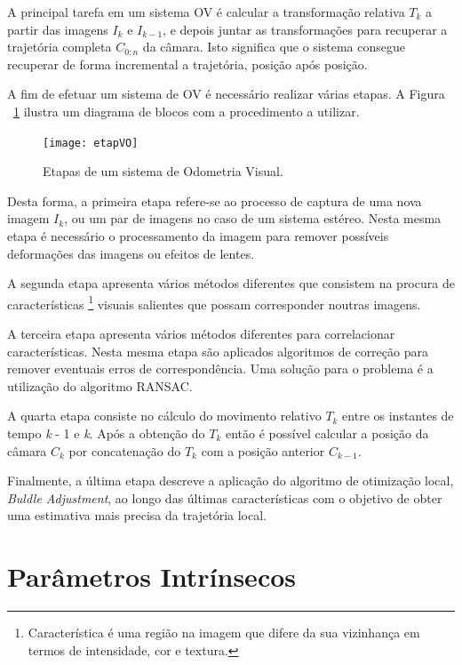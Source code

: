 A principal tarefa em um sistema OV é calcular a transformação relativa $T_k$ a partir das imagens $I_k$ e $I_{k-1}$, e depois juntar as transformações para recuperar a trajetória completa $C_{0:n}$ da câmara. Isto significa que o sistema consegue recuperar de forma incremental a trajetória, posição após posição.

A fim de efetuar um sistema de OV é necessário realizar várias etapas. A Figura ~\ref{fig:etapVO} ilustra um diagrama de blocos com a procedimento a utilizar.

\begin{figure}[h!] %
	\begin{center}
		\leavevmode		
		\texttt{[image: etapVO]}
		\caption{Etapas de um sistema de Odometria Visual.}
		\label{fig:etapVO}
	\end{center}
\end{figure}

Desta forma, a primeira etapa refere-se  ao processo de captura de uma nova imagem \textit{$I_k$}, ou um par de imagens no caso de um sistema estéreo. Nesta mesma etapa é necessário o processamento da imagem para remover possíveis deformações das imagens ou efeitos de lentes.

A segunda etapa apresenta vários métodos diferentes que consistem na procura de características  \footnote{Característica é uma região na imagem que difere da sua vizinhança em termos de intensidade, cor e textura.} visuais salientes que possam corresponder noutras imagens.

A terceira etapa apresenta vários métodos diferentes para correlacionar características. Nesta mesma etapa são aplicados algoritmos de correção  para remover eventuais erros de correspondência. Uma solução para o problema é a utilização do algoritmo RANSAC.

A quarta etapa consiste no cálculo do movimento relativo $T_k$ entre os instantes de tempo \textit{k} - 1 e \textit{k}. Após a obtenção do $T_k$ então é possível calcular a posição da câmara $C_k$ por concatenação do $T_k$ com a posição anterior $C_{k-1}$.

Finalmente, a última etapa descreve a aplicação do algoritmo de otimização local, \textit{Buldle Adjustment}, ao longo das últimas características com o objetivo de obter uma estimativa mais precisa da trajetória local.


\section{Parâmetros Intrínsecos} \label{section:Intrin}

